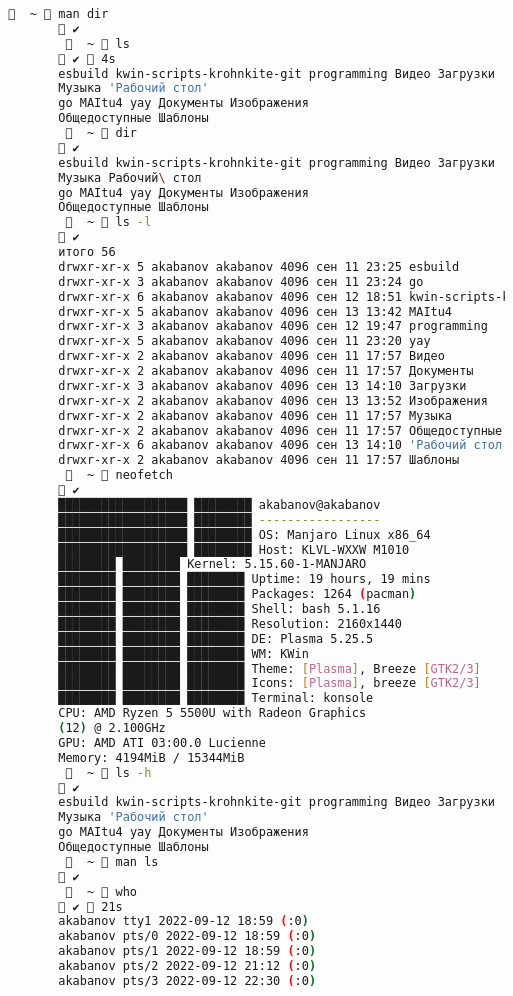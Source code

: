 \documentclass{article}
\begin{document}
	\begin{lstlisting}[language=bash]
		     ~  man dir
		 ✔
		     ~  ls
		 ✔  4s  
		esbuild kwin-scripts-krohnkite-git programming Видео Загрузки
		Музыка 'Рабочий стол'
		go MAItu4 yay Документы Изображения
		Общедоступные Шаблоны
		     ~  dir
		 ✔
		esbuild kwin-scripts-krohnkite-git programming Видео Загрузки
		Музыка Рабочий\ стол
		go MAItu4 yay Документы Изображения
		Общедоступные Шаблоны
		     ~  ls -l
		 ✔
		итого 56
		drwxr-xr-x 5 akabanov akabanov 4096 сен 11 23:25 esbuild
		drwxr-xr-x 3 akabanov akabanov 4096 сен 11 23:24 go
		drwxr-xr-x 6 akabanov akabanov 4096 сен 12 18:51 kwin-scripts-krohnkite-git
		drwxr-xr-x 5 akabanov akabanov 4096 сен 13 13:42 MAItu4
		drwxr-xr-x 3 akabanov akabanov 4096 сен 12 19:47 programming
		drwxr-xr-x 5 akabanov akabanov 4096 сен 11 23:20 yay
		drwxr-xr-x 2 akabanov akabanov 4096 сен 11 17:57 Видео
		drwxr-xr-x 2 akabanov akabanov 4096 сен 11 17:57 Документы
		drwxr-xr-x 3 akabanov akabanov 4096 сен 13 14:10 Загрузки
		drwxr-xr-x 2 akabanov akabanov 4096 сен 13 13:52 Изображения
		drwxr-xr-x 2 akabanov akabanov 4096 сен 11 17:57 Музыка
		drwxr-xr-x 2 akabanov akabanov 4096 сен 11 17:57 Общедоступные
		drwxr-xr-x 6 akabanov akabanov 4096 сен 13 14:10 'Рабочий стол'
		drwxr-xr-x 2 akabanov akabanov 4096 сен 11 17:57 Шаблоны
		     ~  neofetch
		 ✔
		██████████████████ ████████ akabanov@akabanov
		██████████████████ ████████ -----------------
		██████████████████ ████████ OS: Manjaro Linux x86_64
		██████████████████ ████████ Host: KLVL-WXXW M1010
		████████ ████████ Kernel: 5.15.60-1-MANJARO
		████████ ████████ ████████ Uptime: 19 hours, 19 mins
		████████ ████████ ████████ Packages: 1264 (pacman)
		████████ ████████ ████████ Shell: bash 5.1.16
		████████ ████████ ████████ Resolution: 2160x1440
		████████ ████████ ████████ DE: Plasma 5.25.5
		████████ ████████ ████████ WM: KWin
		████████ ████████ ████████ Theme: [Plasma], Breeze [GTK2/3]
		████████ ████████ ████████ Icons: [Plasma], breeze [GTK2/3]
		████████ ████████ ████████ Terminal: konsole
		CPU: AMD Ryzen 5 5500U with Radeon Graphics
		(12) @ 2.100GHz
		GPU: AMD ATI 03:00.0 Lucienne
		Memory: 4194MiB / 15344MiB
		     ~  ls -h
		 ✔
		esbuild kwin-scripts-krohnkite-git programming Видео Загрузки
		Музыка 'Рабочий стол'
		go MAItu4 yay Документы Изображения
		Общедоступные Шаблоны
		     ~  man ls
		 ✔
		     ~  who
		 ✔  21s  
		akabanov tty1 2022-09-12 18:59 (:0)
		akabanov pts/0 2022-09-12 18:59 (:0)
		akabanov pts/1 2022-09-12 18:59 (:0)
		akabanov pts/2 2022-09-12 21:12 (:0)
		akabanov pts/3 2022-09-12 22:30 (:0)

\end{lstlisting}
\end{document}

